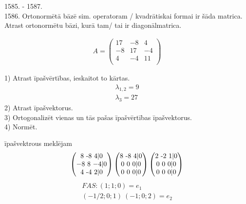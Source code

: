 \documentclass[12pt]{article}
\begin{document}
\pagebreak

1585. - 1587. \\
1586. Ortonormētā bāzē sim. operatoram / kvadrātiskai formai ir šāda matrica. Atrast ortonormētu bāzi, kurā tam/ tai ir diagonālmatrica.

\begin{gather*}
	A = 
	\begin{pmatrix}
   		17 & -8 & 4 \\
   		-8 & 17 & -4 \\
   		4 & -4 & 11 \\
	\end{pmatrix}
\end {gather*}


1) Atrast īpašvērtības, ieskaitot to kārtas.
\begin{gather*} %
	\lambda_{1,2} = 9 \\
	\lambda_{3} = 27
\end{gather*}
2) Atrast īpašvektorus. \\
3) Ortogonalizēt vienas un tās pašas īpašvērtības īpašvektorus. \\
4) Normēt.

īpašvektrous meklējam 
\begin{gather*}
	\begin{pmatrix} %
		8 $ -8 $ 4  | 0 \\
		-8 $ 8 $ -4 | 0 \\
		4 $ -4 $ 2 | 0 \\ 
	\end{pmatrix} 
	\begin{pmatrix}
		8 $ -8 $ 4  | 0 \\
		0 $ 0 $ 0 | 0 \\
		0 $ 0 $ 0 | 0 \\
	\end{pmatrix}
	\begin{pmatrix}
		2 $ -2 $ 1  | 0 \\
		0 $ 0 $ 0 | 0 \\
		0 $ 0 $ 0 | 0 \\
	\end{pmatrix} %
\end{gather*}
\begin{gather*}
	FAS: %
	(1;1;0) = e_1 \\
	(-1/2; 0; 1) ~ (-1;0;2) = e_2%
\end{gather*}
\end{document}
